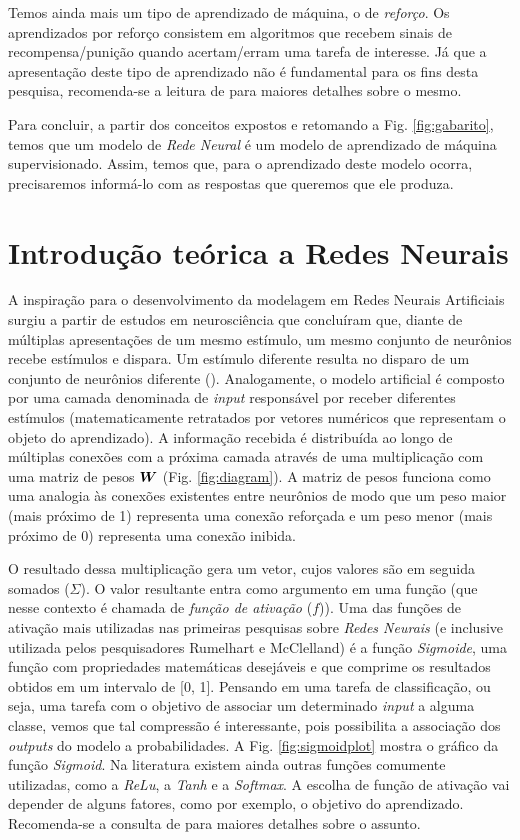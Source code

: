 Temos ainda mais um tipo de aprendizado de máquina, o de \textit{reforço}. Os aprendizados por reforço consistem em algoritmos que recebem sinais de recompensa/punição quando acertam/erram uma tarefa de interesse. Já que a apresentação deste tipo de aprendizado não é fundamental para os fins desta pesquisa, recomenda-se a leitura de \cite{KLMSurvey:1996} para maiores detalhes sobre o mesmo.

Para concluir, a partir dos conceitos expostos e retomando a Fig. \ref{fig:gabarito}, temos que um modelo de \textit{Rede Neural} é um modelo de aprendizado de máquina supervisionado. Assim, temos que, para o aprendizado deste modelo ocorra, precisaremos informá-lo com as respostas que queremos que ele produza.

\section{Introdução teórica a Redes Neurais}
\label{sec:intro-rn}
A inspiração para o desenvolvimento da modelagem em Redes Neurais Artificiais surgiu a partir de estudos em neurosciência que concluíram que, diante de múltiplas apresentações de um mesmo estímulo, um mesmo conjunto de neurônios recebe estímulos e dispara. Um estímulo diferente resulta no disparo de um conjunto de neurônios diferente (\cite{hubel:1962}). Analogamente, o modelo artificial é composto por uma camada denominada de \textit{input} responsável por receber diferentes estímulos (matematicamente retratados por vetores numéricos que representam o objeto do aprendizado). A informação recebida é distribuída ao longo de múltiplas conexões com a próxima camada através de uma multiplicação com uma matriz de pesos $\bm{W}$ (Fig. \ref{fig:diagram}). A matriz de pesos funciona como uma analogia às conexões existentes entre neurônios de modo que um peso maior (mais próximo de 1) representa uma conexão reforçada e um peso menor (mais próximo de 0) representa uma conexão inibida.

  

O resultado dessa multiplicação gera um vetor, cujos valores são em seguida somados ($\displaystyle\Sigma$). O valor resultante entra como argumento em uma função (que nesse contexto é chamada de \textit{função de ativação} ($f$)). Uma das funções de ativação mais utilizadas nas primeiras pesquisas sobre \textit{Redes Neurais} (e inclusive utilizada pelos pesquisadores Rumelhart e McClelland) é a função \textit{Sigmoide}, uma função com propriedades matemáticas desejáveis e que comprime os resultados obtidos em um intervalo de [0, 1]. Pensando em uma tarefa de classificação, ou seja, uma tarefa com o objetivo de associar um determinado \textit{input} a alguma classe, vemos que tal compressão é interessante, pois possibilita a associação dos \textit{outputs} do modelo a probabilidades. A Fig. \ref{fig:sigmoidplot} mostra o gráfico da função \textit{Sigmoid}. Na literatura existem ainda outras funções comumente utilizadas, como a \textit{ReLu}, a \textit{Tanh} e a \textit{Softmax}. A escolha de função de ativação vai depender de alguns fatores, como por exemplo, o objetivo do aprendizado. Recomenda-se a consulta de \cite{Goodfellow-et-al-2016} para maiores detalhes sobre o assunto.

